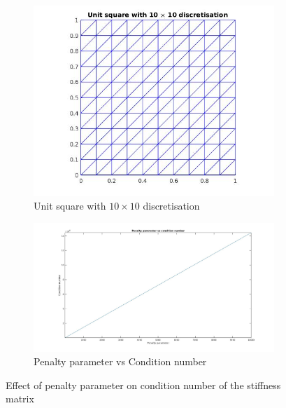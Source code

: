 \documentclass[a4paper,twoside,openright]{book}
\begin{document}
\begin{figure}
\begin{subfigure}{\textwidth}	
  \includegraphics[width=\linewidth]{grid_penalty_parameter.jpg}
  \caption{Unit square with $10 \times 10$ discretisation}
  \label{grid_penalty_para}
\end{subfigure}
\begin{subfigure}{\textwidth}	
	\includegraphics[width=\linewidth]{penalty_condition_number.jpg}
	\caption{Penalty parameter vs Condition number}
	\label{penalty_condition_number}
\end{subfigure}
\caption{Effect of penalty parameter on condition number of the stiffness matrix}
\label{effect_penalty_parameter}
\end{figure}
\end{document}
